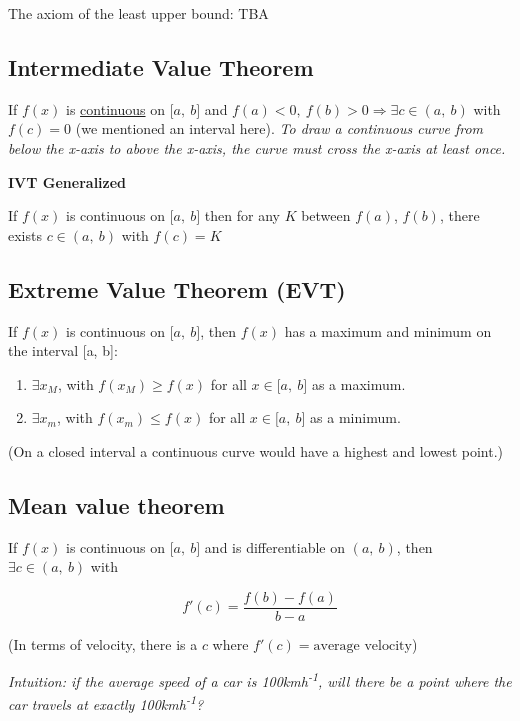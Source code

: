 \documentclass[12pt]{article}
\theoremstyle{plain}
\theoremstyle{remark}
\theoremstyle{definition}
\begin{document}
The axiom of the least upper bound: TBA


\subsection{Intermediate Value
Theorem}

If \(f(x)\) is \uline{continuous} on \(\lbrack a,\ b\rbrack\) and
\(f(a) < 0,\ f(b) > 0 \Rightarrow \exists c \in (a,\ b)\) with
\(f(c) = 0\) (we mentioned an interval here). \emph{To draw a continuous
curve from below the x-axis to above the x-axis, the curve must cross
the x-axis at least once.}

\textbf{IVT Generalized}

If \(f(x)\) is continuous on \(\lbrack a,\ b\rbrack\) then for any \(K\)
between \(f(a)\), \(f(b)\), there exists \(c \in (a,\ b)\) with
\(f(c) = K\)


\subsection{Extreme Value Theorem
(EVT)}

If \(f(x)\) is continuous on \(\lbrack a,\ b\rbrack\), then \(f(x)\) has
a maximum and minimum on the interval {[}a, b{]}:

\begin{enumerate}
\def\labelenumi{\arabic{enumi}.}
\item
  \(\exists x_{M}\), with \(f\left( x_{M} \right) \geq f(x)\) for all
  \(x \in \lbrack a,\ b\rbrack\) as a maximum.
\item
  \(\mathbf{\exists}x_{m}\), with \(f\left( x_{m} \right) \leq f(x)\)
  for all \(x \in \lbrack a,\ b\rbrack\) as a minimum.
\end{enumerate}

(On a closed interval a continuous curve would have a highest and lowest
point.)


\subsection{Mean value theorem}

If \(f(x)\) is continuous on \(\lbrack a,\ b\rbrack\) and is
differentiable on \((a,\ b)\), then \(\exists c \in (a,\ b)\) with

\[f'(c) = \frac{f(b) - f(a)}{b - a}\]

(In terms of velocity, there is a \(c\) where
\(f'(c) = \text{average\ velocity}\))

\emph{Intuition: if the average speed of a car is
100kmh\textsuperscript{-1}, will there be a point where the car travels
at exactly 100kmh\textsuperscript{-1}?}
\end{document}
